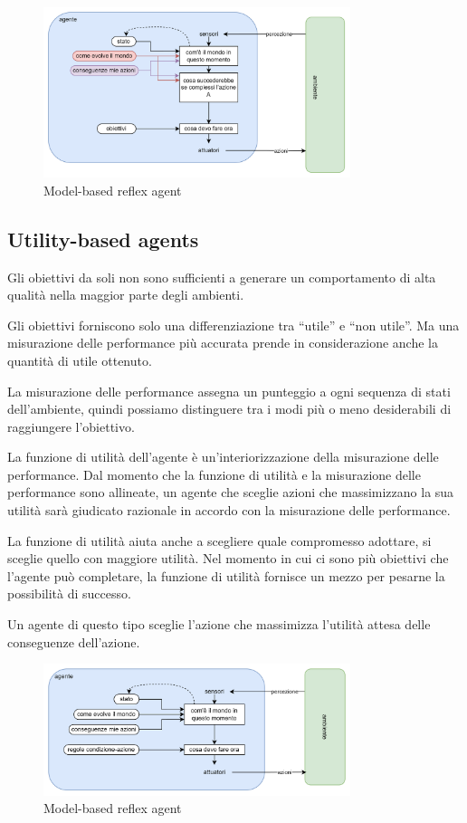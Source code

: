 \begin{figure}[H]
	\centering
	\includegraphics[width=0.8\textwidth]{capitoli/agenti-intelligenti/imgs/goal-based.png}
	\caption{Model-based reflex agent}
	\label{fig:immagine4}
\end{figure}

\subsection{Utility-based agents}

Gli obiettivi da soli non sono sufficienti a generare un comportamento di alta qualità nella maggior parte degli ambienti.

Gli obiettivi forniscono solo una differenziazione tra “utile” e “non utile”. Ma una misurazione delle performance più accurata prende in considerazione anche la quantità di utile ottenuto.

La misurazione delle performance assegna un punteggio a ogni sequenza di stati dell’ambiente, quindi possiamo distinguere tra i modi più o meno desiderabili di raggiungere l’obiettivo.

La funzione di utilità dell’agente è un’interiorizzazione della misurazione delle performance.
Dal momento che la funzione di utilità e la misurazione delle performance sono allineate, un agente che sceglie azioni che massimizzano la sua utilità sarà giudicato razionale in accordo con la misurazione delle performance.

La funzione di utilità aiuta anche a scegliere quale compromesso adottare, si sceglie quello con maggiore utilità. Nel momento in cui ci sono più obiettivi che l’agente può completare, la funzione di utilità fornisce un mezzo per pesarne la possibilità di successo.

Un agente di questo tipo sceglie l’azione che massimizza l’utilità attesa delle conseguenze dell’azione.

\begin{figure}[H]
	\centering
	\includegraphics[width=0.8\textwidth]{capitoli/agenti-intelligenti/imgs/model-based.png}
	\caption{Model-based reflex agent}
	\label{fig:immagine5}
\end{figure}

